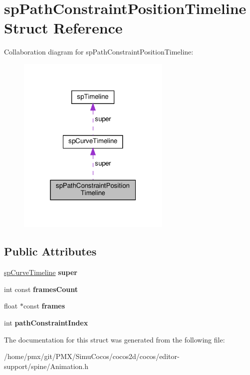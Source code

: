 \hypertarget{structspPathConstraintPositionTimeline}{}\section{sp\+Path\+Constraint\+Position\+Timeline Struct Reference}
\label{structspPathConstraintPositionTimeline}


Collaboration diagram for sp\+Path\+Constraint\+Position\+Timeline\+:
\nopagebreak
\begin{figure}[H]
\begin{center}
\leavevmode
\includegraphics[width=208pt]{structspPathConstraintPositionTimeline__coll__graph}
\end{center}
\end{figure}
\subsection*{Public Attributes}
\begin{DoxyCompactItemize}
\item 
\mbox{\label{structspPathConstraintPositionTimeline_ae778742de1ebe45710aeb95c384a48f6}} 
\hyperlink{structspCurveTimeline}{sp\+Curve\+Timeline} {\bfseries super}
\item 
\mbox{\label{structspPathConstraintPositionTimeline_a276ea77f4b61db9b443bd0c99aff88de}} 
int const {\bfseries frames\+Count}
\item 
\mbox{\label{structspPathConstraintPositionTimeline_aedb2f65512d5b1756cf45502b2e4aa28}} 
float $\ast$const {\bfseries frames}
\item 
\mbox{\label{structspPathConstraintPositionTimeline_a2dccb898ba729c7ee29dc9d1860fc81b}} 
int {\bfseries path\+Constraint\+Index}
\end{DoxyCompactItemize}


The documentation for this struct was generated from the following file\+:\begin{DoxyCompactItemize}
\item 
/home/pmx/git/\+P\+M\+X/\+Simu\+Cocos/cocos2d/cocos/editor-\/support/spine/Animation.\+h\end{DoxyCompactItemize}
